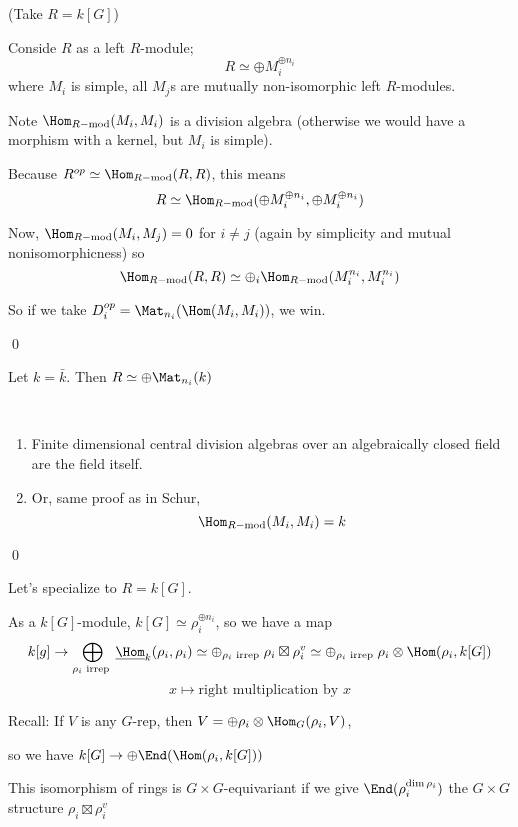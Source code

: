 \documentclass[x11names,reqno,14pt]{extarticle}
\newcommand{\bark}{\bar{k}}
\newcommand{\Rmod}{R-\text{mod}}
\begin{document}
\proof (Take $R = k[G]$)

Conside $R$ as a left $R$-module;
\[
R \simeq \oplus M_i^{\oplus n_i}
\]
where $M_i$ is simple, all $M_j$s are mutually non-isomorphic left $R$-modules.

 Note $\Hom_{\Rmod}(M_i,M_i)$ is a division algebra (otherwise we would have a morphism with a kernel, but $M_i$ is simple). 

Because $R^{op} \simeq \Hom_{\Rmod}(R,R)$, this means 
\[
R \simeq \Hom_{\Rmod}(\oplus M_i^{\oplus n_i}, \oplus M_i^{\oplus n_i})
\]

Now, $\Hom_{\Rmod}(M_i,M_j) = 0$ for $i \neq j$ (again by simplicity and mutual nonisomorphicness) so 
\[
\Hom_{\Rmod}(R,R) \simeq \oplus_i \Hom_{\Rmod}(M_i^{n_i},M_i^{n_i})
\]

So if we take $D_i^{op} = \Mat_{n_i}(\Hom(M_i,M_i))$, we win. 

\qed

\cor

Let $k = \bark$. Then $R \simeq \oplus \Mat_{n_i}(k)$

\proof
\,
\begin{enumerate}

\item Finite dimensional central division algebras over an algebraically closed field are the field itself. 

\item Or, same proof as in Schur, 
\[
\Hom_{\Rmod}(M_i,M_i) = k
\]

\end{enumerate}

\qed

Let's specialize to $R = k[G]$. 

As a $k[G]$-module, $k[G] \simeq \rho_i^{\oplus n_i}$, so we have a map
\[
k[g]\to\bigoplus_{\rho_i\text{ irrep }} \underline{\Hom}_k(\rho_i,\rho_i) \simeq \oplus_{\rho_i\text{ irrep }}\rho_i\boxtimes\rho_i^v \simeq \oplus_{\rho_i\text{ irrep }}\rho_i\otimes\Hom(\rho_i,k[G])
\]
\[
x \mapsto \text{right multiplication by } x
\]

Recall: If $V$ is any $G$-rep, then $V = \oplus \rho_i\otimes\Hom_G(\rho_i,V)$, 

so we have $k[G] \to \oplus \End(\Hom(\rho_i, k[G]))$

\claim

This isomorphism of rings is $G\times G$-equivariant if we give $\End(\rho_i^{\dim\rho_i})$ the $G\times G$ structure $\rho_i\boxtimes\rho_i^v$

\proof
\end{document}
